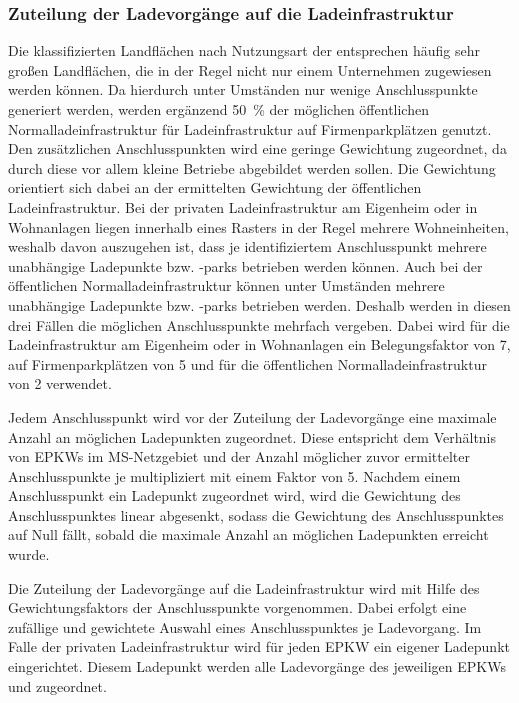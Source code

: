 \subsubsection{Zuteilung der Ladevorgänge auf die Ladeinfrastruktur}

Die klassifizierten Landflächen nach Nutzungsart der  entsprechen häufig sehr großen Landflächen, die in der Regel nicht nur einem Unternehmen zugewiesen werden können.
Da hierdurch unter Umständen nur wenige Anschlusspunkte generiert werden, werden ergänzend \SI{50}{\percent} der möglichen öffentlichen Normalladeinfrastruktur für Ladeinfrastruktur auf Firmenparkplätzen genutzt.
Den zusätzlichen Anschlusspunkten wird eine geringe Gewichtung zugeordnet, da durch diese vor allem kleine Betriebe abgebildet werden sollen.
Die Gewichtung orientiert sich dabei an der ermittelten Gewichtung der öffentlichen Ladeinfrastruktur.
Bei der privaten Ladeinfrastruktur am Eigenheim oder in Wohnanlagen liegen innerhalb eines Rasters in der Regel mehrere Wohneinheiten, weshalb davon auszugehen ist, dass je identifiziertem Anschlusspunkt mehrere unabhängige Ladepunkte bzw. -parks betrieben werden können.
Auch bei der öffentlichen Normalladeinfrastruktur können unter Umständen mehrere unabhängige Ladepunkte bzw. -parks betrieben werden.
Deshalb werden in diesen drei Fällen die möglichen Anschlusspunkte mehrfach vergeben.
Dabei wird für die Ladeinfrastruktur am Eigenheim oder in Wohnanlagen ein Belegungsfaktor von \num{7}, auf Firmenparkplätzen von \num{5} und für die öffentlichen Normalladeinfrastruktur von \num{2} verwendet.\medskip

Jedem Anschlusspunkt wird vor der Zuteilung der Ladevorgänge eine maximale Anzahl an möglichen Ladepunkten zugeordnet.
Diese entspricht dem Verhältnis von \glspl{EPKW} im \gls{MS}-Netzgebiet und der Anzahl möglicher zuvor ermittelter Anschlusspunkte je \UC multipliziert mit einem Faktor von \num{5}.
Nachdem einem Anschlusspunkt ein Ladepunkt zugeordnet wird, wird die Gewichtung des Anschlusspunktes linear abgesenkt, sodass die Gewichtung des Anschlusspunktes auf Null fällt, sobald die maximale Anzahl an möglichen Ladepunkten erreicht wurde.\medskip

Die Zuteilung der Ladevorgänge auf die Ladeinfrastruktur wird mit Hilfe des Gewichtungsfaktors der Anschlusspunkte vorgenommen.
Dabei erfolgt eine zufällige und gewichtete Auswahl eines Anschlusspunktes je Ladevorgang.
Im Falle der privaten Ladeinfrastruktur wird für jeden \gls{EPKW} ein eigener Ladepunkt eingerichtet.
Diesem Ladepunkt werden alle Ladevorgänge des jeweiligen \glspl{EPKW} und \UC zugeordnet.\medskip

